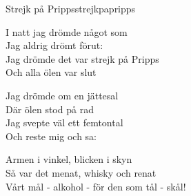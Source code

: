 \begin{song}{Strejk på Pripps}{strejkpapripps}
\begin{vers}
I natt jag drömde något som\\
Jag aldrig drömt förut:\\
Jag drömde det var strejk på Pripps\\
Och alla ölen var slut\\
\end{vers}
\begin{vers}
Jag drömde om en jättesal\\
Där ölen stod på rad\\
Jag svepte väl ett femtontal\\
Och reste mig och sa:\\
\end{vers}
\begin{vers}
Armen i vinkel, blicken i skyn\\
Så var det menat, whisky och renat\\
Vårt mål - alkohol - för den som tål - skål!\\
\end{vers}
\end{song}
